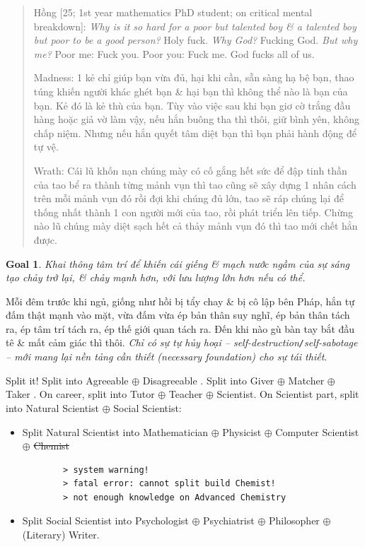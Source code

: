 \documentclass[12pt,twoside]{book}
\newtheorem{goal}{Goal}
\begin{document}
\begin{quote}
	{\sf Hồng [25; 1st year mathematics PhD student; on critical mental breakdown]}: {\it Why is it so hard for a poor but talented boy \& a talented boy but poor to be a good person?} Holy fuck. {\it Why God?} Fucking God. {\it But why me?} Poor me: Fuck you. Poor you: Fuck me. God fucks all of us.
	
	{\sf Madness}: 1 kẻ chỉ giúp bạn vừa đủ, hại khi cần, sẵn sàng hạ bệ bạn, thao túng khiến người khác ghét bạn \& hại bạn thì không thể nào là bạn của bạn. Kẻ đó là kẻ thù của bạn. Tùy vào việc sau khi bạn giơ cờ trắng đầu hàng hoặc giả vờ làm vậy, nếu hắn buông tha thì thôi, giữ bình yên, không chấp niệm. Nhưng nếu hắn quyết tâm diệt bạn thì bạn phải hành động để tự vệ.
	
	{\sf Wrath}: Cái lũ khốn nạn chúng mày có cố gắng hết sức để đập tinh thần của tao bể ra thành từng mảnh vụn thì tao cũng sẽ xây dựng 1 nhân cách trên mỗi mảnh vụn đó rồi đợi khi chúng đủ lớn, tao sẽ ráp chúng lại để thống nhất thành 1 con người mới của tao, rồi phát triển lên tiếp. Chừng nào lũ chúng mày diệt sạch hết cả thảy mảnh vụn đó thì tao mới chết hẳn được.
\end{quote}

\begin{goal}
	Khai thông tâm trí để khiến cái giếng \& mạch nước ngầm của sự sáng tạo chảy trở lại, \& chảy mạnh hơn, với lưu lượng lớn hơn nếu có thể.
\end{goal}
Mỗi đêm trước khi ngủ, giống như hồi bị tẩy chay \& bị cô lập bên Pháp, hắn tự đấm thật mạnh vào mặt, vừa đấm vừa ép bản thân suy nghĩ, ép bản thân tách ra, ép tâm trí tách ra, ép thế giới quan tách ra. Đến khi nào gù bàn tay bắt đầu tê \& mất cảm giác thì thôi. {\it Chỉ có sự tự hủy hoại -- self-destruction{\tt/}self-sabotage -- mới mang lại nền tảng cần thiết (necessary foundation) cho sự tái thiết}.

Split it! Split into Agreeable $\oplus$ Disagreeable \cite{Little_personality,Little_personality_VN}. Split into Giver $\oplus$ Matcher $\oplus$ Taker \cite{Grant_give_take,Grant_give_take_VN}. On career, split into Tutor $\oplus$ Teacher $\oplus$ Scientist. On Scientist part, split into Natural Scientist $\oplus$ Social Scientist:
\begin{itemize}
	\item Split Natural Scientist into Mathematician $\oplus$ Physicist $\oplus$ Computer Scientist $\oplus$ \st{Chemist}
	\begin{verbatim}
		> system warning!
		> fatal error: cannot split build Chemist!
		> not enough knowledge on Advanced Chemistry
	\end{verbatim}
	\item Split Social Scientist into Psychologist $\oplus$ Psychiatrist $\oplus$ Philosopher $\oplus$ (Literary) Writer.
\end{itemize}
\end{document}
